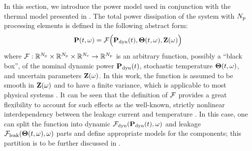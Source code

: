 In this section, we introduce the power model used in conjunction with the thermal model presented in . The total power dissipation of the system with ${N_\text{p}}$ processing elements is defined in the following abstract form:
\begin{equation} \elabel{power-model}
  \vP(\t, \o) = \f\Big(\vP_\dyn(\t), \vTO(\t, \o), \vZ(\o)\Big)
\end{equation}
where $\mathcal{F}: \mathbb{R}^{N_\text{p}} \times \mathbb{R}^{N_\text{p}} \times \mathbb{R}^{N_\text{v}} \to \mathbb{R}^{N_\text{p}}$ is an arbitrary function, possibly a ``black box'', of the nominal dynamic power $\mathbf{P}_{\text{dyn}}(t)$, stochastic temperature ${\boldsymbol\Theta}(t, \omega)$, and uncertain parameters $\mathbf{Z}(\omega)$. In this work, the function is assumed to be smooth in $\mathbf{Z}(\omega)$ and to have a finite variance, which is applicable to most physical systems \cite{xiu2002}. It can be seen that the definition of $\mathcal{F}$ provides a great flexibility to account for such effects as the well-known, strictly nonlinear interdependency between the leakage current and temperature \cite{srivastava2010, liu2007}. In this case, one can split the function into dynamic $\mathcal{F}_{\text{dyn}}(\mathbf{P}_{\text{dyn}}(t), \omega)$ and leakage $\mathcal{F}_{\text{leak}}({\boldsymbol\Theta}(t, \omega), \omega)$ parts and define appropriate models for the components; this partition is to be further discussed in .
